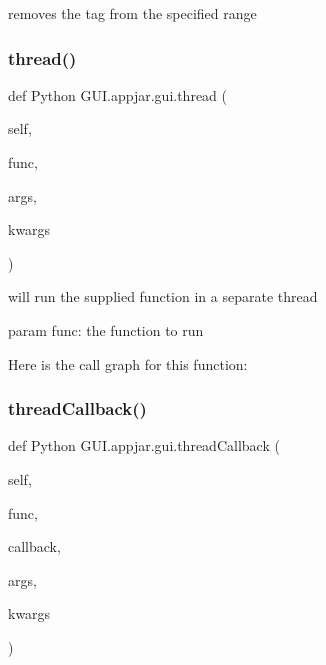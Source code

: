 \begin{DoxyVerb}
\begin{DoxyVerb}removes the tag from the specified range \end{DoxyVerb}
 \mbox{\label{class_python_01_g_u_i_1_1appjar_1_1gui_a841944979bdfe335c983c40b29c903ac}} 
\subsubsection{\texorpdfstring{thread()}{thread()}}
{\footnotesize\ttfamily def Python G\+U\+I.\+appjar.\+gui.\+thread (\begin{DoxyParamCaption}\item[{}]{self,  }\item[{}]{func,  }\item[{}]{args,  }\item[{}]{kwargs }\end{DoxyParamCaption})}

\begin{DoxyVerb}will run the supplied function in a separate thread

param func: the function to run
\end{DoxyVerb}
 Here is the call graph for this function\+:
\mbox{\label{class_python_01_g_u_i_1_1appjar_1_1gui_acac6edaf6ce89f73ee80aca5542901d1}} 
\subsubsection{\texorpdfstring{thread\+Callback()}{threadCallback()}}
{\footnotesize\ttfamily def Python G\+U\+I.\+appjar.\+gui.\+thread\+Callback (\begin{DoxyParamCaption}\item[{}]{self,  }\item[{}]{func,  }\item[{}]{callback,  }\item[{}]{args,  }\item[{}]{kwargs }\end{DoxyParamCaption})}


\end{DoxyVerb}
